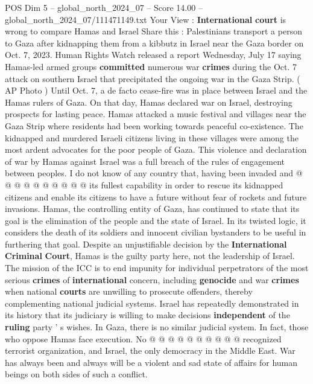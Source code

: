 \begin{textsample}{POS Dim 5 – global\_north\_2024\_07 – Score 14.00 – global\_north\_2024\_07/111471149.txt}  \label{ex:f5_pos_306}
Your View : \textbf{International} \textbf{court} is wrong to compare Hamas and Israel Share this : Palestinians transport a person to Gaza after kidnapping them from a kibbutz in Israel near the Gaza border on Oct. 7, 2023.
Human Rights Watch released a report Wednesday, July 17 saying Hamas-led armed groups \textbf{committed} numerous war \textbf{crimes} during the Oct. 7 attack on southern Israel that precipitated the ongoing war in the Gaza Strip. ( AP Photo ) Until Oct. 7, a de facto cease-fire was in place between Israel and the Hamas rulers of Gaza.
On that day, Hamas declared war on Israel, destroying prospects for lasting peace.
Hamas attacked a music festival and villages near the Gaza Strip where residents had been working towards peaceful co-existence.
The kidnapped and murdered Israeli citizens living in these villages were among the most ardent advocates for the poor people of Gaza.
This violence and declaration of war by Hamas against Israel was a full breach of the rules of engagement between peoples.
I do not know of any country that, having been invaded and @ @ @ @ @ @ @ @ @ @ its fullest capability in order to rescue its kidnapped citizens and enable its citizens to have a future without fear of rockets and future invasions.
Hamas, the controlling entity of Gaza, has continued to state that its goal is the elimination of the people and the state of Israel.
In its twisted logic, it considers the death of its soldiers and innocent civilian bystanders to be useful in furthering that goal.
Despite an unjustifiable decision by the \textbf{International} \textbf{Criminal} \textbf{Court}, Hamas is the guilty party here, not the leadership of Israel.
The mission of the ICC is to end impunity for individual perpetrators of the most serious \textbf{crimes} of \textbf{international} concern, including \textbf{genocide} and war \textbf{crimes} when national \textbf{courts} are unwilling to prosecute offenders, thereby complementing national judicial systems.
Israel has repeatedly demonstrated in its history that its judiciary is willing to make decisions \textbf{independent} of the \textbf{ruling} party ' s wishes.
In Gaza, there is no similar judicial system.
In fact, those who oppose Hamas face execution.
No @ @ @ @ @ @ @ @ @ @ recognized terrorist organization, and Israel, the only democracy in the Middle East.
War has always been and always will be a violent and sad state of affairs for human beings on both sides of such a conflict.

\end{textsample}
